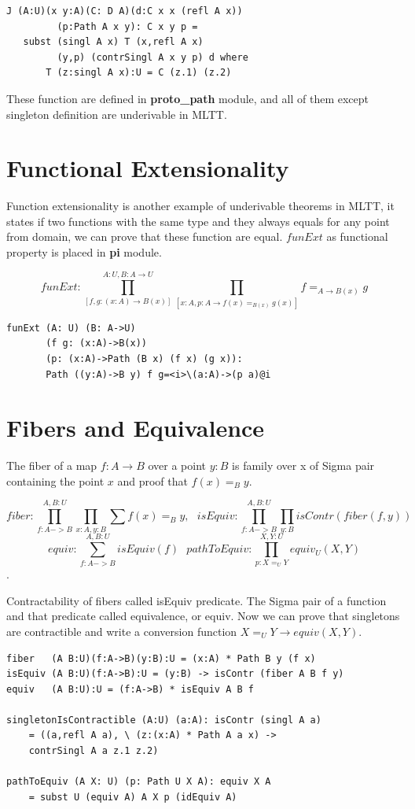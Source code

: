 \documentclass{svproc}
\begin{document}
\begin{lstlisting}[mathescape=true]
J (A:U)(x y:A)(C: D A)(d:C x x (refl A x))
         (p:Path A x y): C x y p =
   subst (singl A x) T (x,refl A x)
         (y,p) (contrSingl A x y p) d where
       T (z:singl A x):U = C (z.1) (z.2)
\end{lstlisting}

These function are defined in {\bf proto\_path} module, and all of them
except singleton definition are underivable in MLTT.

\section{Functional Extensionality}

Function extensionality is another example of underivable theorems in MLTT, it
states if two functions with the same type and they always equals for
any point from domain, we can prove that these function are equal.
$funExt$ as functional property is placed in {\bf pi} module.

$$funExt: \prod_{[f,g: (x:A) \rightarrow B(x)]}^{A: U,B:A\rightarrow U}\prod_{[x:A,p:A\rightarrow f(x) =_{B(x)} g(x)]} f =_{A\rightarrow B(x)} g$$

\begin{lstlisting}[mathescape=true]
funExt (A: U) (B: A->U)
       (f g: (x:A)->B(x))
       (p: (x:A)->Path (B x) (f x) (g x)):
       Path ((y:A)->B y) f g=<i>\(a:A)->(p a)@i
\end{lstlisting}

\section{Fibers and Equivalence}

The fiber of a map $f : A \rightarrow B$ over a point $y : B$ is family over x
of Sigma pair containing the point $x$ and proof that $f(x)=_B y$.

$$fiber : \prod_{f:A->B}^{A,B:U}\prod_{x:A,y:B}\sum f(x) =_B y,\ \ \ 
  isEquiv : \prod_{f:A->B}^{A,B:U}\prod_{y:B} isContr(fiber(f,y))$$
$$equiv : \sum_{f:A->B}^{A,B:U} isEquiv(f) \ \ \ 
  pathToEquiv: \prod_{p: X =_U Y}^{X,Y:U} equiv_U(X,Y)$$.

Contractability of fibers called isEquiv predicate. The Sigma pair of
a function and that predicate called equivalence, or equiv. Now we
can prove that singletons are contractible and write a conversion
function $X=_U Y \rightarrow equiv(X,Y)$.

\begin{lstlisting}[mathescape=true]
fiber   (A B:U)(f:A->B)(y:B):U = (x:A) * Path B y (f x)
isEquiv (A B:U)(f:A->B):U = (y:B) -> isContr (fiber A B f y)
equiv   (A B:U):U = (f:A->B) * isEquiv A B f

singletonIsContractible (A:U) (a:A): isContr (singl A a)
    = ((a,refl A a), \ (z:(x:A) * Path A a x) ->
    contrSingl A a z.1 z.2)

pathToEquiv (A X: U) (p: Path U X A): equiv X A
    = subst U (equiv A) A X p (idEquiv A)
\end{lstlisting}
\end{document}
